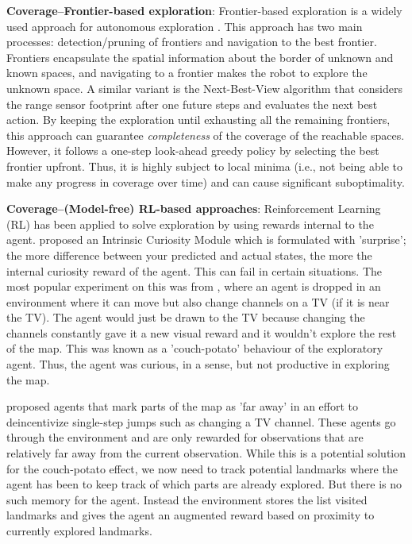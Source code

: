 \documentclass{article}
\newcommand{\ph}[1]{{\textbf{#1}:}} %
\begin{document}
\ph{Coverage--Frontier-based exploration}
Frontier-based exploration is a widely used approach for autonomous exploration \cite{yamauchi1997frontier,tao2007motion,keidar2012robot,heng2015efficient}.
This approach has two main processes: detection/pruning of frontiers and navigation to the best frontier.
Frontiers encapsulate the spatial information about the border of unknown and known spaces, and navigating to a frontier makes the robot to explore the unknown space.
A similar variant is the Next-Best-View algorithm that considers the range sensor footprint after one future steps and evaluates the next best action. \cite{gonzalez2002navigation,grabowski2003autonomous}
%
By keeping the exploration until exhausting all the remaining frontiers, this approach can guarantee \textit{completeness} of the coverage of the reachable spaces.
However, it follows a one-step look-ahead greedy policy by selecting the best frontier upfront.
Thus, it is highly subject to local minima (i.e., not being able to make any progress in coverage over time) and can cause significant suboptimality.



\ph{Coverage--(Model-free) RL-based approaches}
Reinforcement Learning (RL) has been applied to solve exploration by using rewards internal to the agent. \citet{pathak_icm} proposed an Intrinsic Curiosity Module which is formulated with 'surprise'; the more difference between your predicted and actual states, the more the internal curiosity reward of the agent. This can fail in certain situations. The most popular experiment on this was from \cite{burda2018study}, where an agent is dropped in an environment where it can move but also change channels on a TV (if it is near the TV). The agent would just be drawn to the TV because changing the channels constantly gave it a new visual reward and it wouldn't explore the rest of the map. This was known as a 'couch-potato' behaviour of the exploratory agent. Thus, the agent was curious, in a sense, but not productive in exploring the map.

\citet{ECR2018} proposed agents that mark parts of the map as 'far away' in an effort to deincentivize single-step jumps such as changing a TV channel. These agents go through the environment and are only rewarded for observations that are relatively far away from the current observation. While this is a potential solution for the couch-potato effect, we now need to track potential landmarks where the agent has been to keep track of which parts are already explored. But there is no such memory for the agent. Instead the environment stores the list visited landmarks and gives the agent an augmented reward based on proximity to currently explored landmarks.
\end{document}
